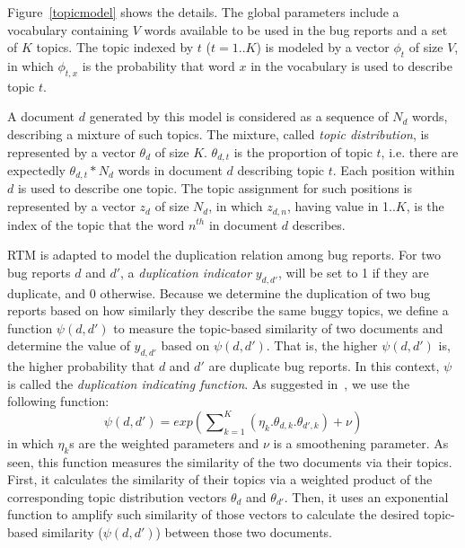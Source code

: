 
Figure~\ref{topicmodel} shows the details.  The global
parameters include a vocabulary containing $V$ words available to be
used in the bug reports and a set of $K$ topics. The topic indexed by
$t$ ($t=1..K$) is modeled by a vector $\phi_t$ of size $V$, in which
$\phi_{t,x}$ is the probability that word $x$ in the vocabulary is
used to describe topic $t$.

A document $d$ generated by this model is considered as a sequence of
$N_d$ words, describing a mixture of such topics. The mixture, called
{\em topic distribution}, is represented by a vector $\theta_d$ of
size $K$. $\theta_{d,t}$ is the proportion of topic $t$, i.e. there
are expectedly $\theta_{d,t}*N_d$ words in document $d$ describing
topic $t$. Each position within $d$ is used to describe one topic. The
topic assignment for such positions is represented by a vector $z_d$
of size $N_d$, in which $z_{d,n}$, having value in 1..$K$, is the
index of the topic that the word $n^{th}$ in document $d$ describes.

\vspace{0.04in}
RTM is adapted to model the duplication relation among bug
reports. For two bug reports $d$ and $d'$, a {\em duplication
indicator} $y_{d,d'}$, will be set to 1 if they are duplicate, and 0
otherwise. Because we determine the duplication of two bug reports
based on how similarly they describe the same buggy topics, we define
a function $\psi(d,d')$ to measure the topic-based similarity of two
documents and determine the value of $y_{d,d'}$ based on
$\psi(d,d')$. That is, the higher $\psi(d,d')$ is, the higher
probability that $d$ and $d'$ are duplicate bug reports. In this
context, $\psi$ is called the {\em duplication indicating
function}. As suggested in~\cite{RTM}, we use the following function:
$$\psi(d, d') = exp({\sum\nolimits_{k=1}^K(\eta_k.\theta_{d,k}.\theta_{d',k})+
\nu})$$ in which $\eta_k$s are the weighted parameters and $\nu$ is a
smoothening parameter. As seen, this function measures the similarity of
the two documents via their topics. First, it calculates the
similarity of their topics via a weighted product of the corresponding
topic distribution vectors $\theta_d$ and $\theta_{d'}$. Then, it uses
an exponential function to amplify such similarity of those
vectors to calculate the desired topic-based similarity ($\psi(d,d')$)
between those two documents.

